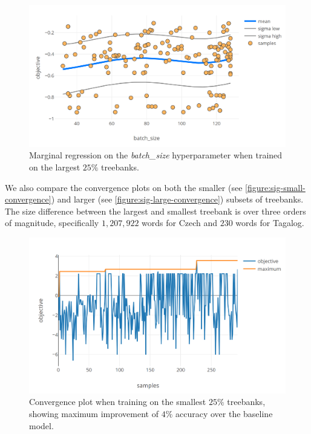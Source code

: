 \begin{figure}
	\begin{center}
		\includegraphics[width=1.0\textwidth]{images/sig-large-batch.png}
		\caption{Marginal regression on the \emph{batch\_size} hyperparameter when trained on the largest $25\%$ treebanks.}
		\label{figure:sig-large-batch}
	\end{center}
\end{figure}

We also compare the convergence plots on both the smaller (see \autoref{figure:sig-small-convergence}) and larger (see \autoref{figure:sig-large-convergence}) subsets of treebanks. The size difference between the largest and smallest treebank is over three orders of magnitude, specifically $1,207,922$ words for Czech and $230$ words for Tagalog.


\begin{figure}
	\begin{center}
		\includegraphics[width=1.0\textwidth]{images/sig-small-convergence.png}
		\caption{Convergence plot when training on the smallest $25\%$ treebanks, showing maximum improvement of $4\%$ accuracy over the baseline model.}
		\label{figure:sig-small-convergence}
	\end{center}
\end{figure}


